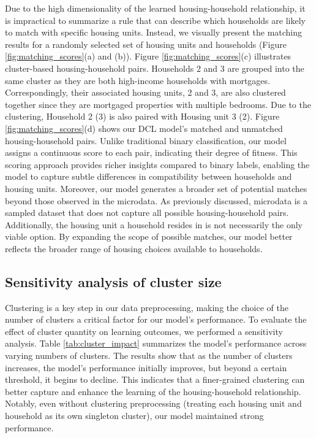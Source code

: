 \documentclass[]{nature_mod}
\begin{document}
Due to the high dimensionality of the learned housing-household relationship, it is impractical to summarize a rule that can describe which households are likely to match with specific housing units. Instead, we visually present the matching results for a randomly selected set of housing units and households (Figure \ref{fig:matching_scores}(a) and (b)). Figure \ref{fig:matching_scores}(c) illustrates cluster-based housing-household pairs. Households 2 and 3 are grouped into the same cluster as they are both high-income households with mortgages. Correspondingly, their associated housing units, 2 and 3, are also clustered together since they are mortgaged properties with multiple bedrooms. Due to the clustering, Household 2 (3) is also paired with Housing unit 3 (2). Figure \ref{fig:matching_scores}(d) shows our DCL model’s matched and unmatched housing-household pairs. Unlike traditional binary classification, our model assigns a continuous score to each pair, indicating their degree of fitness. This scoring approach provides richer insights compared to binary labels, enabling the model to capture subtle differences in compatibility between households and housing units. Moreover, our model generates a broader set of potential matches beyond those observed in the microdata. As previously discussed, microdata is a sampled dataset that does not capture all possible housing-household pairs. Additionally, the housing unit a household resides in is not necessarily the only viable option. By expanding the scope of possible matches, our model better reflects the broader range of housing choices available to households.


\subsection{Sensitivity analysis of cluster size}
\label{sec:sensitivity}

Clustering is a key step in our data preprocessing, making the choice of the number of clusters a critical factor for our model's performance. To evaluate the effect of cluster quantity on learning outcomes, we performed a sensitivity analysis. Table \ref{tab:cluster_impact} summarizes the model's performance across varying numbers of clusters. The results show that as the number of clusters increases, the model's performance initially improves, but beyond a certain threshold, it begins to decline. This indicates that a finer-grained clustering can better capture and enhance the learning of the housing-household relationship. Notably, even without clustering preprocessing (treating each housing unit and household as its own singleton cluster), our model maintained strong performance. 
\end{document}
